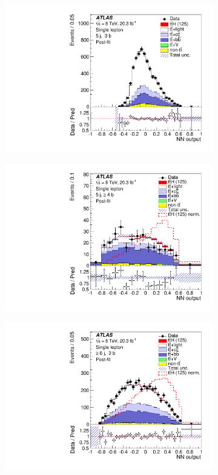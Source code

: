 \begin{figure}[tpb!]
  \centering
  \begin{subfigure}{0.49\textwidth}
  \includegraphics[width=\textwidth]{Analysis/Figures_ttH/NN_5jetex3btagex8TeV.pdf}
  \caption{}\end{subfigure}
  \begin{subfigure}{0.49\textwidth}
  \includegraphics[width=\textwidth]{Analysis/Figures_ttH/NN_5jetex4btagin8TeV.pdf}
  \caption{}\end{subfigure}
  \begin{subfigure}{0.49\textwidth}
  \includegraphics[width=\textwidth]{Analysis/Figures_ttH/NN_6jetin3btagex8TeV.pdf}

\end{subfigure}
\end{figure}
